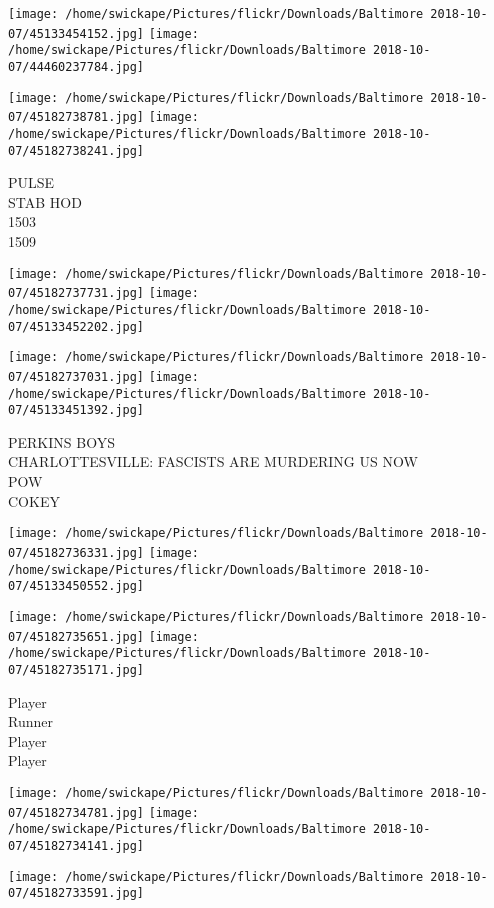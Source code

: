 \documentclass[10pt,letterpaper]{article}
\begin{document}
\texttt{[image: /home/swickape/Pictures/flickr/Downloads/Baltimore 2018-10-07/45133454152.jpg]}
\texttt{[image: /home/swickape/Pictures/flickr/Downloads/Baltimore 2018-10-07/44460237784.jpg]}

\texttt{[image: /home/swickape/Pictures/flickr/Downloads/Baltimore 2018-10-07/45182738781.jpg]}
\texttt{[image: /home/swickape/Pictures/flickr/Downloads/Baltimore 2018-10-07/45182738241.jpg]}

PULSE\\
STAB HOD\\
1503\\
1509
\pagebreak

\texttt{[image: /home/swickape/Pictures/flickr/Downloads/Baltimore 2018-10-07/45182737731.jpg]}
\texttt{[image: /home/swickape/Pictures/flickr/Downloads/Baltimore 2018-10-07/45133452202.jpg]}

\texttt{[image: /home/swickape/Pictures/flickr/Downloads/Baltimore 2018-10-07/45182737031.jpg]}
\texttt{[image: /home/swickape/Pictures/flickr/Downloads/Baltimore 2018-10-07/45133451392.jpg]}

PERKINS BOYS\\
CHARLOTTESVILLE: FASCISTS ARE MURDERING US NOW\\
POW\\
COKEY
\pagebreak

\texttt{[image: /home/swickape/Pictures/flickr/Downloads/Baltimore 2018-10-07/45182736331.jpg]}
\texttt{[image: /home/swickape/Pictures/flickr/Downloads/Baltimore 2018-10-07/45133450552.jpg]}

\texttt{[image: /home/swickape/Pictures/flickr/Downloads/Baltimore 2018-10-07/45182735651.jpg]}
\texttt{[image: /home/swickape/Pictures/flickr/Downloads/Baltimore 2018-10-07/45182735171.jpg]}

Player\\
Runner\\
Player\\
Player
\pagebreak

\texttt{[image: /home/swickape/Pictures/flickr/Downloads/Baltimore 2018-10-07/45182734781.jpg]}
\texttt{[image: /home/swickape/Pictures/flickr/Downloads/Baltimore 2018-10-07/45182734141.jpg]}

\vspace{0.25in}
\texttt{[image: /home/swickape/Pictures/flickr/Downloads/Baltimore 2018-10-07/45182733591.jpg]}
\end{document}
